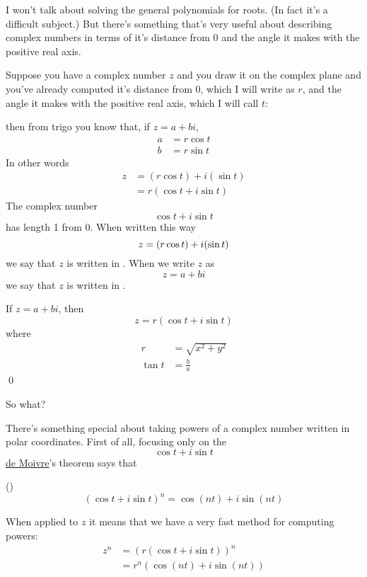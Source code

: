 I won't talk about solving the general polynomials for roots.
(In fact it's a difficult subject.)
But there's something that's very useful about describing
complex numbers in terms of it's distance from 0 and the angle it makes
with the positive real axis.

Suppose you have a complex number $z$ and you draw it on the 
complex plane and you've already computed it's distance
from 0, which I will write as $r$, and the angle
it makes with the positive real axis, which I will call $t$:

then from trigo you know that, if $z = a + bi$,
\begin{align*}
a &= r \cos t \\
b &= r \sin t 
\end{align*}
In other words
\begin{align*}
z 
&= (r \cos t) + i (\sin t) \\
&= r(\cos t + i \sin t) 
\end{align*}
The complex number 
\[
\cos t + i \sin t
\]
has length 1 from 0.
When written this way
\[
z = (r \cos t) + i (\sin t) \\
\]
we say that $z$ is written in
.
When we write $z$ as
\[
z = a + bi
\]
we say that $z$ is written in .
\begin{prop}
  If $z = a + bi$, then
  \[
  z = r(\cos t + i \sin t)
  \]
  where
  \begin{align*}
    r &= \sqrt{x^2 + y^2} \\
    \tan t &= \frac{b}{a}
  \end{align*}
  \qed
\end{prop}

So what?

There's something special about taking powers of a complex
number written in polar coordinates.
First of all, focusing only on the 
\[
\cos t + i \sin t
\]
\href{https://en.wikipedia.org/wiki/Abraham_de_Moivre}{de Moivre}'s theorem says that

\begin{thm} \textnormal{()}
\[
(\cos t + i \sin t)^n
=
\cos (nt) + i \sin (nt)
\]
\end{thm}

When applied to $z$ it means that we have a very fast method for computing
powers:
\begin{align*}
z^n  
&= (r (\cos t + i \sin t))^n \\
&= r^n (\cos (nt) + i \sin (nt))
\end{align*}


